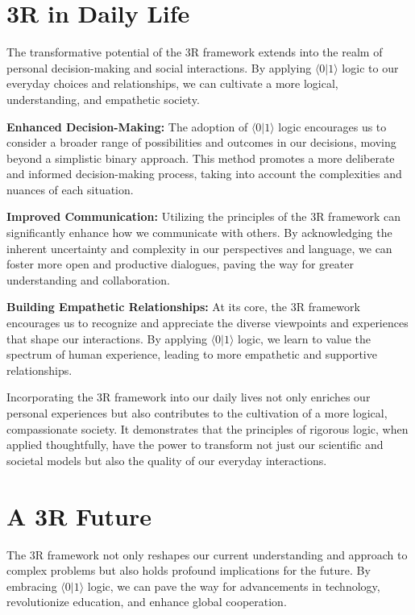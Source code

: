 \documentclass[12pt]{article}
\newcommand{\qbit}{\ensuremath{\langle 0 | 1 \rangle}}
\begin{document}
\section*{3R in Daily Life}

The transformative potential of the 3R framework extends into the realm of personal decision-making and social interactions. By applying \qbit{} logic to our everyday choices and relationships, we can cultivate a more logical, understanding, and empathetic society.

\textbf{Enhanced Decision-Making:} The adoption of \qbit{} logic encourages us to consider a broader range of possibilities and outcomes in our decisions, moving beyond a simplistic binary approach. This method promotes a more deliberate and informed decision-making process, taking into account the complexities and nuances of each situation.

\textbf{Improved Communication:} Utilizing the principles of the 3R framework can significantly enhance how we communicate with others. By acknowledging the inherent uncertainty and complexity in our perspectives and language, we can foster more open and productive dialogues, paving the way for greater understanding and collaboration.

\textbf{Building Empathetic Relationships:} At its core, the 3R framework encourages us to recognize and appreciate the diverse viewpoints and experiences that shape our interactions. By applying \qbit{} logic, we learn to value the spectrum of human experience, leading to more empathetic and supportive relationships.

Incorporating the 3R framework into our daily lives not only enriches our personal experiences but also contributes to the cultivation of a more logical, compassionate society. It demonstrates that the principles of rigorous logic, when applied thoughtfully, have the power to transform not just our scientific and societal models but also the quality of our everyday interactions.

\section*{A 3R Future}

The 3R framework not only reshapes our current understanding and approach to complex problems but also holds profound implications for the future. By embracing \qbit{} logic, we can pave the way for advancements in technology, revolutionize education, and enhance global cooperation.
\end{document}

